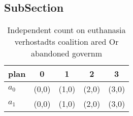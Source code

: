 \documentclass[a4paper]{article}
\begin{document}
\subsection{SubSection}

\begin{table}
\begin{adjustbox}{width=0.5\columnwidth}
\begin{tabular}{|l|l|l|l|l|}
\hline
\textbf{plan} & \multicolumn{1}{c|}{\textbf{0}} & \multicolumn{1}{c|}{\textbf{1}} & \multicolumn{1}{c|}{\textbf{2}} & \multicolumn{1}{c|}{\textbf{3}} \\ \hline
\textbf{$a_0$}  & (0,0) & (1,0) & (2,0) & (3,0) \\ \hline
\textbf{$a_1$}  & (0,0) & (1,0) & (2,0) & (3,0) \\ \hline
\end{tabular}
\end{adjustbox}
\caption{Independent count on euthanasia verhostadts coalition ared Or abandoned governm
}
\end{table}
\end{document}
